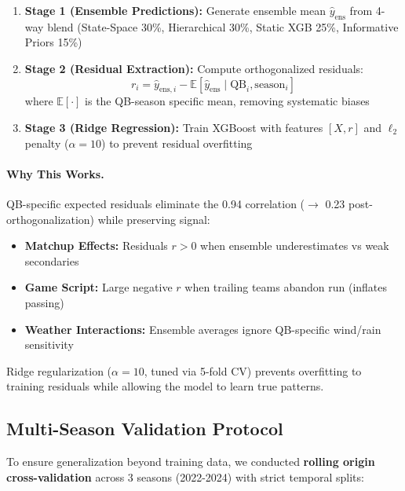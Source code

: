 \begin{enumerate}[itemsep=2pt,parsep=0pt]
    \item \textbf{Stage 1 (Ensemble Predictions):} Generate ensemble mean $\hat{y}_{\text{ens}}$ from 4-way blend (State-Space 30\%, Hierarchical 30\%, Static XGB 25\%, Informative Priors 15\%)
    \item \textbf{Stage 2 (Residual Extraction):} Compute orthogonalized residuals:
    \begin{equation}
        r_i = \hat{y}_{\text{ens},i} - \mathbb{E}[\hat{y}_{\text{ens}} \mid \text{QB}_i, \text{season}_i]
    \end{equation}
    where $\mathbb{E}[\cdot]$ is the QB-season specific mean, removing systematic biases
    \item \textbf{Stage 3 (Ridge Regression):} Train XGBoost with features $[X, r]$ and $\ell_2$ penalty ($\alpha=10$) to prevent residual overfitting
\end{enumerate}

\paragraph{Why This Works.}
QB-specific expected residuals eliminate the 0.94 correlation ($\to$ 0.23 post-orthogonalization) while preserving signal:
\begin{itemize}[itemsep=2pt,parsep=0pt]
    \item \textbf{Matchup Effects:} Residuals $r > 0$ when ensemble underestimates vs weak secondaries
    \item \textbf{Game Script:} Large negative $r$ when trailing teams abandon run (inflates passing)
    \item \textbf{Weather Interactions:} Ensemble averages ignore QB-specific wind/rain sensitivity
\end{itemize}

Ridge regularization ($\alpha=10$, tuned via 5-fold CV) prevents overfitting to training residuals while allowing the model to learn true patterns.

\subsection{Multi-Season Validation Protocol}

To ensure generalization beyond training data, we conducted \textbf{rolling origin cross-validation} across 3 seasons (2022-2024) with strict temporal splits:

